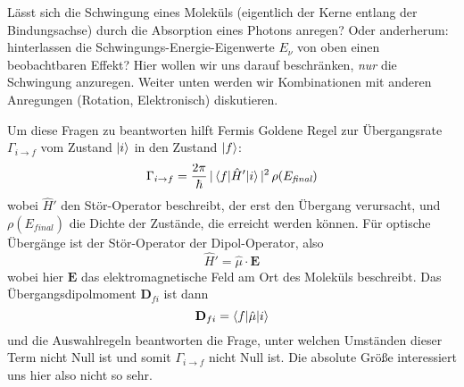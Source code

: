 Lässt sich die Schwingung eines Moleküls (eigentlich der Kerne entlang der Bindungsachse) durch die Absorption eines Photons anregen? Oder anderherum: hinterlassen die Schwingungs-Energie-Eigenwerte $E_\nu$ von oben einen beobachtbaren Effekt? Hier wollen wir uns darauf beschränken, \emph{nur} die Schwingung anzuregen. Weiter unten werden wir Kombinationen mit anderen Anregungen (Rotation, Elektronisch) diskutieren.

Um diese Fragen zu beantworten hilft Fermis Goldene Regel zur Übergangsrate $\Gamma_{i \rightarrow f}$ vom Zustand $\ket{i}$ in den Zustand $\ket{f}$:
\begin{equation}
\Gamma_{i \rightarrow f} = \frac{2 \pi}{\hbar} \, |\braket{f | \hat{H}' | i} |^2 \, \rho(E_\textit{final})
\end{equation}
wobei $\hat{H}'$ den Stör-Operator beschreibt, der erst den Übergang verursacht, und $ \rho(E_\textit{final})$ die Dichte der Zustände, die erreicht werden können. Für optische Übergänge ist der Stör-Operator der Dipol-Operator, also
\begin{equation}
\hat{H}' = \hat{\mu} \cdot \mathbf{E}
\end{equation}
wobei hier $\mathbf{E}$ das elektromagnetische Feld am Ort des Moleküls beschreibt. Das Übergangsdipolmoment $\mathbf{D}_{fi}$ ist dann 
\begin{equation}
 \mathbf{D}_{fi} = \braket{f | \hat{\mu} | i} 
\end{equation}
und die Auswahlregeln beantworten die Frage, unter welchen Umständen dieser Term nicht Null ist und somit $\Gamma_{i \rightarrow f} $ nicht Null ist. Die absolute Größe interessiert uns hier also nicht so sehr.

